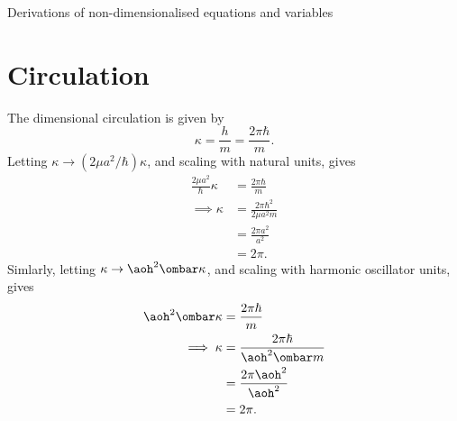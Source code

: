 \begin{chapter}{\label{cha:nondim}Derivations of non-dimensionalised equations
and variables}
  \section{Circulation}
  The dimensional circulation is given by
  \begin{equation*}
    \kappa = \frac{h}{m} = \frac{2\pi\hbar}{m}.
  \end{equation*}
  Letting $\kappa \to (2\mu a^{2}/\hbar)\kappa$, and scaling with natural
  units, gives
  \begin{equation*}
    \begin{aligned}
      \frac{2\mu a^{2}}{\hbar} \kappa &= \frac{2\pi \hbar}{m} \\
      \implies \kappa &= \frac{2\pi \hbar^{2}}{2\mu a^{2} m} \\
      &= \frac{2\pi a^{2}}{a^{2}} \\
      &= 2\pi.
    \end{aligned}
  \end{equation*}
  Simlarly, letting $\kappa \to \aoh^{2}\ombar\kappa$, and scaling with
  harmonic oscillator units, gives
  \begin{equation*}
    \begin{aligned}
      \aoh^{2} \ombar \kappa &= \frac{2\pi \hbar}{m} \\
      \implies \kappa &= \frac{2\pi \hbar}{\aoh^{2} \ombar m} \\
      &= \frac{2\pi \aoh^{2}}{\aoh^{2}} \\
      &= 2\pi.
    \end{aligned}
  \end{equation*}
\end{chapter}
